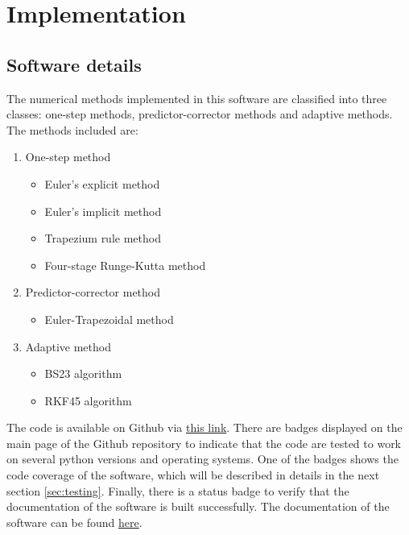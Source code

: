 \chapter{Implementation}
\label{chap:code-implementation}
\section{Software details}
\label{sec:software-details}
The numerical methods implemented in this software are classified into three classes: one-step methods, predictor-corrector methods and adaptive methods. The methods included are:
\begin{enumerate}
    \item One-step method
    \begin{itemize}
        \item Euler's explicit method
        \item Euler's implicit method
        \item Trapezium rule method
        \item Four-stage Runge-Kutta method
    \end{itemize}
    \item Predictor-corrector method
    \begin{itemize}
        \item Euler-Trapezoidal method
    \end{itemize}
    \item Adaptive method
    \begin{itemize}
        \item BS23 algorithm
        \item RKF45 algorithm
    \end{itemize}
\end{enumerate}
The code is available on Github via \href{https://github.com/FarmHJ/numerical-solver}{this link}. There are badges displayed on the main page of the Github repository to indicate that the code are tested to work on several python versions and operating systems. One of the badges shows the code coverage of the software, which will be described in details in the next section \ref{sec:testing}. Finally, there is a status badge to verify that the documentation of the software is built successfully. The documentation of the software can be found \href{https://numerical-solver.readthedocs.io/en/latest/index.html}{here}.

